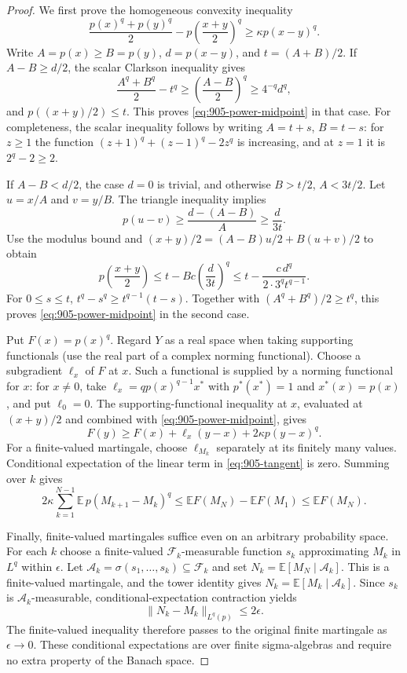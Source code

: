 \documentclass[11pt,a4paper]{article}
\theoremstyle{remark}
\begin{document}
\begin{proof}
We first prove the homogeneous convexity inequality
\begin{equation}\label{eq:905-power-midpoint}
 \frac{p(x)^q+p(y)^q}{2}
 -p\left(\frac{x+y}{2}\right)^q
 \ge\kappa p(x-y)^q.
\end{equation}
Write $A=p(x)\ge B=p(y)$, $d=p(x-y)$, and $t=(A+B)/2$.
If $A-B\ge d/2$, the scalar Clarkson inequality gives
\[
 \frac{A^q+B^q}{2}-t^q
 \ge\left(\frac{A-B}{2}\right)^q\ge4^{-q}d^q,
\]
and $p((x+y)/2)\le t$. This proves \eqref{eq:905-power-midpoint}
in that case. For completeness, the scalar inequality follows by
writing $A=t+s$, $B=t-s$: for $z\ge1$ the function
$(z+1)^q+(z-1)^q-2z^q$ is increasing, and at $z=1$ it is
$2^q-2\ge2$.

If $A-B<d/2$, the case $d=0$ is trivial, and otherwise $B>t/2$,
$A<3t/2$. Let $u=x/A$ and $v=y/B$. The triangle inequality implies
\[
 p(u-v)\ge\frac{d-(A-B)}A\ge\frac{d}{3t}.
\]
Use the modulus bound and
$(x+y)/2=(A-B)u/2+B(u+v)/2$ to obtain
\[
 p\left(\frac{x+y}{2}\right)
 \le t-Bc\left(\frac{d}{3t}\right)^q
 \le t-\frac{c\,d^q}{2\cdot3^q t^{q-1}}.
\]
For $0\le s\le t$, $t^q-s^q\ge t^{q-1}(t-s)$. Together with
$(A^q+B^q)/2\ge t^q$, this proves
\eqref{eq:905-power-midpoint} in the second case.

Put $F(x)=p(x)^q$. Regard $Y$ as a real space when taking supporting
functionals (use the real part of a complex norming functional). Choose a subgradient $\ell_x$ of $F$ at $x$.
Such a functional is supplied by a norming functional for $x$:
for $x\ne0$, take $\ell_x=q p(x)^{q-1}x^*$ with
$p^*(x^*)=1$ and $x^*(x)=p(x)$, and put $\ell_0=0$.
The supporting-functional inequality at $x$, evaluated at $(x+y)/2$
and combined with
\eqref{eq:905-power-midpoint}, gives
\begin{equation}\label{eq:905-tangent}
 F(y)\ge F(x)+\ell_x(y-x)+2\kappa p(y-x)^q.
\end{equation}
For a finite-valued martingale, choose $\ell_{M_k}$ separately at its
finitely many values. Conditional expectation of the linear term in
\eqref{eq:905-tangent} is zero. Summing over $k$ gives
\[
 2\kappa\sum_{k=1}^{N-1}\mathbb E\,p(M_{k+1}-M_k)^q
 \le\mathbb E F(M_N)-\mathbb E F(M_1)
 \le\mathbb E F(M_N).
\]

Finally, finite-valued martingales suffice even on an arbitrary probability
space. For each $k$ choose a finite-valued $\mathcal F_k$-measurable
function $s_k$ approximating $M_k$ in $L^q$ within $\epsilon$.
Let $\mathcal A_k=\sigma(s_1,\ldots,s_k)\subseteq\mathcal F_k$ and set
$N_k=\mathbb E[M_N\mid\mathcal A_k]$. This is a finite-valued martingale,
and the tower identity gives
$N_k=\mathbb E[M_k\mid\mathcal A_k]$. Since $s_k$ is
$\mathcal A_k$-measurable, conditional-expectation contraction yields
\[
 \|N_k-M_k\|_{L^q(p)}\le2\epsilon.
\]
The finite-valued inequality therefore passes to the original finite
martingale as $\epsilon\to0$. These conditional expectations are over
finite sigma-algebras and require no extra property of the Banach space.
\end{proof}
\end{document}
